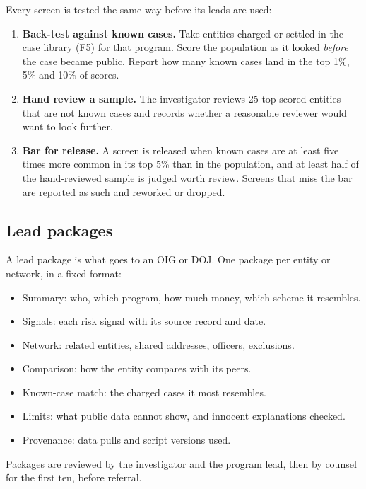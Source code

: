 \documentclass[letterpaper,11pt]{article}
\providecommand{\tightlist}{\setlength{\itemsep}{0pt}\setlength{\parskip}{0pt}}
\begin{document}
Every screen is tested the same way before its leads are used:

\begin{enumerate}
\def\labelenumi{\arabic{enumi}.}
\tightlist
\item
  \textbf{Back-test against known cases.} Take entities charged or
  settled in the case library (F5) for that program. Score the
  population as it looked \emph{before} the case became public. Report
  how many known cases land in the top 1\%, 5\% and 10\% of scores.
\item
  \textbf{Hand review a sample.} The investigator reviews 25 top-scored
  entities that are not known cases and records whether a reasonable
  reviewer would want to look further.
\item
  \textbf{Bar for release.} A screen is released when known cases are at
  least five times more common in its top 5\% than in the population,
  and at least half of the hand-reviewed sample is judged worth review.
  Screens that miss the bar are reported as such and reworked or
  dropped.
\end{enumerate}

\hypertarget{lead-packages}{%
\subsection{Lead packages}\label{lead-packages}}

A lead package is what goes to an OIG or DOJ. One package per entity or
network, in a fixed format:

\begin{itemize}
\tightlist
\item
  Summary: who, which program, how much money, which scheme it
  resembles.
\item
  Signals: each risk signal with its source record and date.
\item
  Network: related entities, shared addresses, officers, exclusions.
\item
  Comparison: how the entity compares with its peers.
\item
  Known-case match: the charged cases it most resembles.
\item
  Limits: what public data cannot show, and innocent explanations
  checked.
\item
  Provenance: data pulls and script versions used.
\end{itemize}

Packages are reviewed by the investigator and the program lead, then by
counsel for the first ten, before referral.
\end{document}
